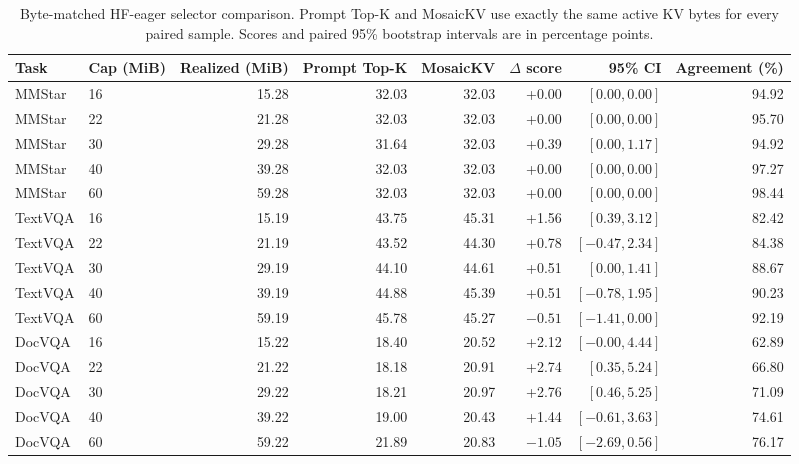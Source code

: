 \begin{table}[t]
\centering
\caption{Byte-matched HF-eager selector comparison.  Prompt Top-K and
MosaicKV use exactly the same active KV bytes for every paired sample.
Scores and paired 95\% bootstrap intervals are in percentage points.}
\label{tab:hf-byte-matched-curves}
\scriptsize
\setlength{\tabcolsep}{3.5pt}
\begin{tabular}{llrrrrrr}
\toprule
Task & Cap (MiB) & Realized (MiB) & Prompt Top-K & MosaicKV & $\Delta$ score & 95\% CI & Agreement (\%) \\
\midrule
MMStar & 16 & 15.28 & 32.03 & 32.03 & +0.00 & $[0.00, 0.00]$ & 94.92 \\
MMStar & 22 & 21.28 & 32.03 & 32.03 & +0.00 & $[0.00, 0.00]$ & 95.70 \\
MMStar & 30 & 29.28 & 31.64 & 32.03 & +0.39 & $[0.00, 1.17]$ & 94.92 \\
MMStar & 40 & 39.28 & 32.03 & 32.03 & +0.00 & $[0.00, 0.00]$ & 97.27 \\
MMStar & 60 & 59.28 & 32.03 & 32.03 & +0.00 & $[0.00, 0.00]$ & 98.44 \\
\midrule
TextVQA & 16 & 15.19 & 43.75 & 45.31 & +1.56 & $[0.39, 3.12]$ & 82.42 \\
TextVQA & 22 & 21.19 & 43.52 & 44.30 & +0.78 & $[-0.47, 2.34]$ & 84.38 \\
TextVQA & 30 & 29.19 & 44.10 & 44.61 & +0.51 & $[0.00, 1.41]$ & 88.67 \\
TextVQA & 40 & 39.19 & 44.88 & 45.39 & +0.51 & $[-0.78, 1.95]$ & 90.23 \\
TextVQA & 60 & 59.19 & 45.78 & 45.27 & $-0.51$ & $[-1.41, 0.00]$ & 92.19 \\
\midrule
DocVQA & 16 & 15.22 & 18.40 & 20.52 & +2.12 & $[-0.00, 4.44]$ & 62.89 \\
DocVQA & 22 & 21.22 & 18.18 & 20.91 & +2.74 & $[0.35, 5.24]$ & 66.80 \\
DocVQA & 30 & 29.22 & 18.21 & 20.97 & +2.76 & $[0.46, 5.25]$ & 71.09 \\
DocVQA & 40 & 39.22 & 19.00 & 20.43 & +1.44 & $[-0.61, 3.63]$ & 74.61 \\
DocVQA & 60 & 59.22 & 21.89 & 20.83 & $-1.05$ & $[-2.69, 0.56]$ & 76.17 \\
\bottomrule
\end{tabular}
\end{table}
